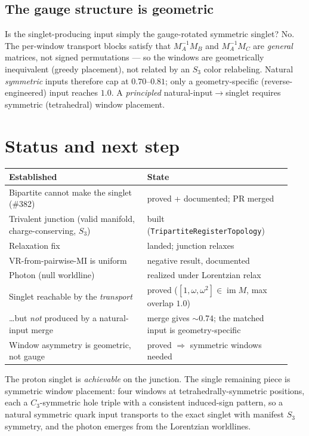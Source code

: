 \documentclass[11pt]{article}
\newcommand{\code}[1]{\texttt{#1}}
\begin{document}
\subsection{The gauge structure is geometric}

Is the singlet-producing input simply the gauge-rotated symmetric singlet? No. The
per-window transport blocks satisfy that $M_A^{-1}M_B$ and $M_A^{-1}M_C$ are
\emph{general} matrices, not signed permutations --- so the windows are
geometrically inequivalent (greedy placement), not related by an $S_3$ color
relabeling. Natural \emph{symmetric} inputs therefore cap at $0.70$--$0.81$; only a
geometry-specific (reverse-engineered) input reaches $1.0$. A \emph{principled}
natural-input$\to$singlet requires symmetric (tetrahedral) window placement.

\section{Status and next step}

\begin{center}
\begin{tabular}{@{}p{0.46\linewidth}p{0.48\linewidth}@{}}
\toprule
\textbf{Established} & \textbf{State}\\
\midrule
Bipartite cannot make the singlet (\#382) & proved + documented; PR merged\\
Trivalent junction (valid manifold, charge-conserving, $S_3$) & built (\code{TripartiteRegisterTopology})\\
Relaxation fix & landed; junction relaxes\\
VR-from-pairwise-MI is uniform & negative result, documented\\
Photon (null worldline) & realized under Lorentzian relax\\
Singlet reachable by the \emph{transport} & proved ($[1,\omega,\omega^2]\in\operatorname{im}M$, max overlap $1.0$)\\
\dots but \emph{not} produced by a natural-input merge & merge gives $\sim 0.74$; the matched input is geometry-specific\\
Window asymmetry is geometric, not gauge & proved $\Rightarrow$ symmetric windows needed\\
\bottomrule
\end{tabular}
\end{center}

\noindent
The proton singlet is \emph{achievable} on the junction. The single remaining
piece is symmetric window placement: four windows at tetrahedrally-symmetric
positions, each a $C_3$-symmetric hole triple with a consistent induced-sign
pattern, so a natural symmetric quark input transports to the exact singlet with
manifest $S_3$ symmetry, and the photon emerges from the Lorentzian worldlines.
\end{document}
